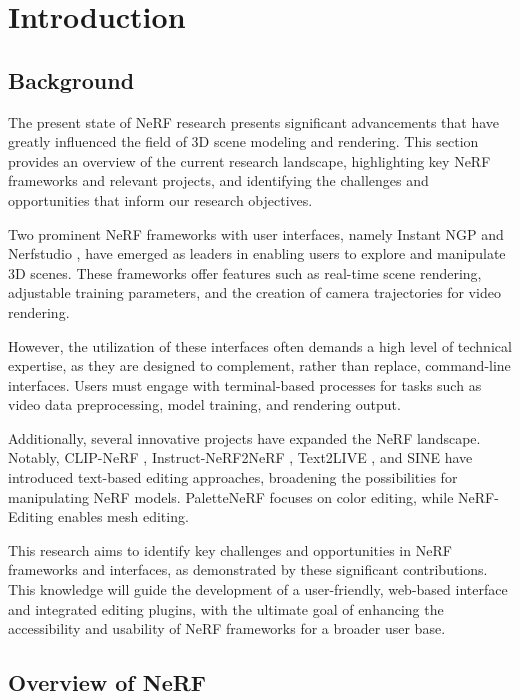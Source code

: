 %
\chapter{Introduction}
\label{sec:intro}

\section{Background}
\label{sec:intro:background}

The present state of NeRF research presents significant advancements that have greatly influenced the field of 3D scene modeling and rendering. This section provides an overview of the current research landscape, highlighting key NeRF frameworks and relevant projects, and identifying the challenges and opportunities that inform our research objectives.

Two prominent NeRF frameworks with user interfaces, namely Instant NGP \cite{mueller2022instant} and Nerfstudio \cite{nerfstudio}, have emerged as leaders in enabling users to explore and manipulate 3D scenes. These frameworks offer features such as real-time scene rendering, adjustable training parameters, and the creation of camera trajectories for video rendering.

However, the utilization of these interfaces often demands a high level of technical expertise, as they are designed to complement, rather than replace, command-line interfaces. Users must engage with terminal-based processes for tasks such as video data preprocessing, model training, and rendering output.

Additionally, several innovative projects have expanded the NeRF landscape. Notably, CLIP-NeRF \cite{CLIP-NeRF}, Instruct-NeRF2NeRF \cite{instructnerf2023}, Text2LIVE \cite{bartal2022text2live}, and SINE \cite{bao2023sine} have introduced text-based editing approaches, broadening the possibilities for manipulating NeRF models. PaletteNeRF \cite{wu2022palettenerf} focuses on color editing, while NeRF-Editing \cite{NeRF-Editing} enables mesh editing.

This research aims to identify key challenges and opportunities in NeRF frameworks and interfaces, as demonstrated by these significant contributions. This knowledge will guide the development of a user-friendly, web-based interface and integrated editing plugins, with the ultimate goal of enhancing the accessibility and usability of NeRF frameworks for a broader user base.


\section{Overview of NeRF}
\label{sec:intro:nerf}


